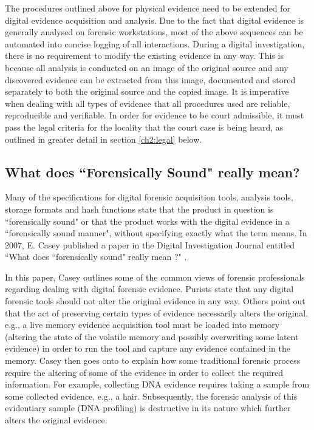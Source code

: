 \documentclass[runningheads,a4paper]{llncs}
\begin{document}
The procedures outlined above for physical evidence need to be extended for digital evidence acquisition and analysis. Due to the fact that digital evidence is generally analysed on forensic workstations, most of the above sequences can be automated into concise logging of all interactions. During a digital investigation, there is no requirement to modify the existing evidence in any way. This is because all analysis is conducted on an image of the original source and any discovered evidence can be extracted from this image, documented and stored separately to both the original source and the copied image. It is imperative when dealing with all types of evidence that all procedures used are reliable, reproducible and verifiable. In order for evidence to be court admissible, it must pass the legal criteria for the locality that the court case is being heard, as outlined in greater detail in section \ref{ch2:legal} below.


\subsection{What does ``Forensically Sound" really mean?}
\label{ch2:sound}

Many of the specifications for digital forensic acquisition tools, analysis tools, storage formats and hash functions state that the product in question is ``forensically sound" or that the product works with the digital evidence in a ``forensically sound manner", without specifying exactly what the term means. In 2007, E. Casey published a paper in the Digital Investigation Journal entitled ``What does ``forensically sound" really mean ?" \cite{forensicallysound}. 

In this paper, Casey outlines some of the common views of forensic professionals regarding dealing with digital forensic evidence. Purists state that any digital forensic tools should not alter the original evidence in any way. Others point out that the act of preserving certain types of evidence necessarily alters the original, e.g., a live memory evidence acquisition tool must be loaded into memory (altering the state of the volatile memory and possibly overwriting some latent evidence) in order to run the tool and capture any evidence contained in the memory. Casey then goes onto to explain how some traditional forensic process require the altering of some of the evidence in order to collect the required information. For example, collecting DNA evidence requires taking a sample from some collected evidence, e.g., a hair. Subsequently, the forensic analysis of this evidentiary sample (DNA profiling) is destructive in its nature which further alters the original evidence.
\end{document}
